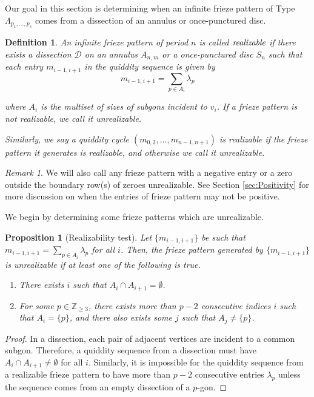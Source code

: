 \documentclass[12pt]{article}
\newtheorem{definition}{Definition}
\newtheorem{proposition}{Proposition}
\theoremstyle{remark}
\newtheorem{remark}{Remark}
\newcommand*{\D}{\mathcal{D}}
\begin{document}
Our goal in this section is determining when an infinite frieze pattern of Type $\Lambda_{p_1,\ldots,p_s}$  comes from a dissection of an annulus or once-punctured disc.

\begin{definition}
An infinite frieze pattern of period $n$ is called $\emph{realizable}$ if there exists a dissection $\D$ on an annulus $A_{n,m}$ or a once-punctured disc $S_n$ such that each entry $m_{i-1,i+1}$ in the quiddity sequence is given by
\[m_{i-1,i+1} = \sum_{p\in A_i}\lambda_p\]

where $A_i$ is the multiset of sizes of subgons incident to  $v_i$. If a frieze pattern is not realizable, we call it \emph{unrealizable}.

Similarly, we say a quiddity cycle $(m_{0,2},\ldots,m_{n-1,n+1})$ is \emph{realizable} if the frieze pattern it generates is realizable, and otherwise we call it \emph{unrealizable}.
\end{definition}

\begin{remark}
We will also call any frieze pattern with a negative entry or a zero outside the boundary row(s) of zeroes unrealizable. See Section \ref{sec:Positivity} for more discussion on when the entries of frieze pattern may not be positive. 
\end{remark}

We begin by determining some frieze patterns which are unrealizable.

\begin{proposition}[Realizability test] \label{proposition:unrealizability1}
Let $\{m_{i-1,i+1}\}$ be such that $m_{i-1,i+1} = \sum_{p\in A_i} \lambda_p$ for all $i$. Then, the frieze pattern generated by $\{m_{i-1,i+1}\}$ is unrealizable if at least one of the following is true.
\begin{enumerate}
    \item There exists $i$ such that $A_i\cap A_{i+1} = \emptyset$.
    \item For some $p \in \mathbb{Z}_{\geq 3}$, there exists more than $p-2$ consecutive indices $i$ such that $A_i = \{p\}$, and there also exists some $j$ such that $A_j \neq \{p\}$.
\end{enumerate}
\end{proposition}

\begin{proof}
In a dissection, each pair of adjacent vertices are incident to a common subgon. Therefore, a quiddity sequence from a dissection must have $A_i \cap A_{i+1} \neq \emptyset$ for all $i$.
Similarly, it is impossible for the quiddity sequence from a realizable frieze pattern to have more than $p-2$ consecutive entries $\lambda_p$ unless the sequence comes from an empty dissection of a $p$-gon. 
\end{proof}
\end{document}
